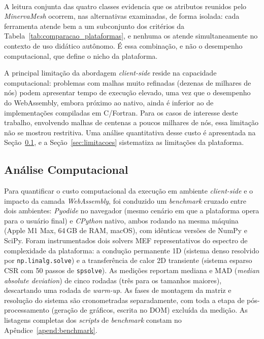 \paragraph{}A leitura conjunta das quatro classes evidencia que os atributos reunidos pelo \textit{MinervaMesh} ocorrem, nas alternativas examinadas, de forma isolada: cada ferramenta atende bem a um subconjunto dos critérios da Tabela~\ref{tab:comparacao_plataformas}, e nenhuma os atende simultaneamente no contexto de uso didático autônomo. É essa combinação, e não o desempenho computacional, que define o nicho da plataforma.

A principal limitação da abordagem \textit{client-side} reside na capacidade computacional: problemas com malhas muito refinadas (dezenas de milhares de nós) podem apresentar tempo de execução elevado, uma vez que o desempenho do WebAssembly, embora próximo ao nativo, ainda é inferior ao de implementações compiladas em C/Fortran. Para os casos de interesse deste trabalho, envolvendo malhas de centenas a poucos milhares de nós, essa limitação não se mostrou restritiva. Uma análise quantitativa desse custo é apresentada na Seção~\ref{sec:analise_computacional}, e a Seção~\ref{sec:limitacoes} sistematiza as limitações da plataforma.

\subsection{Análise Computacional}
\label{sec:analise_computacional}

Para quantificar o custo computacional da execução em ambiente \textit{client-side} e o impacto da camada \textit{WebAssembly}, foi conduzido um \textit{benchmark} cruzado entre dois ambientes: \textit{Pyodide} no navegador (mesmo cenário em que a plataforma opera para o usuário final) e \textit{CPython} nativo, ambos rodando na mesma máquina (Apple M1 Max, 64\,GB de RAM, macOS), com idênticas versões de NumPy e SciPy. Foram instrumentados dois solvers MEF representativos do espectro de complexidade da plataforma: a condução permanente 1D (sistema denso resolvido por \texttt{np.linalg.solve}) e a transferência de calor 2D transiente (sistema esparso CSR com 50 passos de \texttt{spsolve}). As medições reportam mediana e MAD (\textit{median absolute deviation}) de cinco rodadas (três para os tamanhos maiores), descartando uma rodada de \textit{warm-up}. As fases de montagem da matriz e resolução do sistema são cronometradas separadamente, com toda a etapa de pós-processamento (geração de gráficos, escrita no DOM) excluída da medição. As listagens completas dos \textit{scripts} de \textit{benchmark} constam no Apêndice~\ref{apend:benchmark}.


